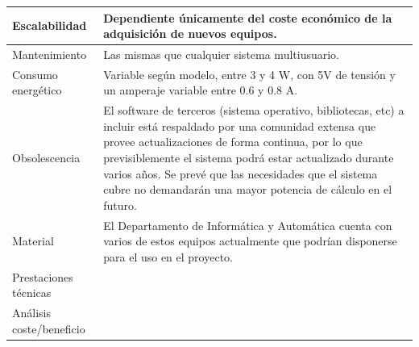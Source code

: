 \begin{table}
\begin{tabular}{|p{2.3cm}|p{12cm}|}
\hline
Escalabilidad&Dependiente únicamente del coste económico de la adquisición de nuevos equipos.\\
\hline
Mantenimiento&Las mismas que cualquier sistema multiusuario.\\
\hline
Consumo energético&Variable según modelo, entre 3 y 4 W, con 5V de tensión y un amperaje variable entre 0.6 y 0.8 A.\\
\hline
Obsolescencia&El software de terceros (sistema operativo, bibliotecas, etc) a incluir está respaldado por una comunidad extensa que provee actualizaciones de forma continua, por lo que previsiblemente el sistema podrá estar actualizado durante varios años.
Se prevé que las necesidades que el sistema cubre no demandarán una mayor potencia de cálculo en el futuro.\\
\hline
Material&El Departamento de Informática y Automática cuenta con varios de estos equipos actualmente que podrían disponerse para el uso en el proyecto.\\
\hline
Prestaciones técnicas&\\
\hline
Análisis coste/beneficio&\\
\hline
\end{tabular}
\end{table}

